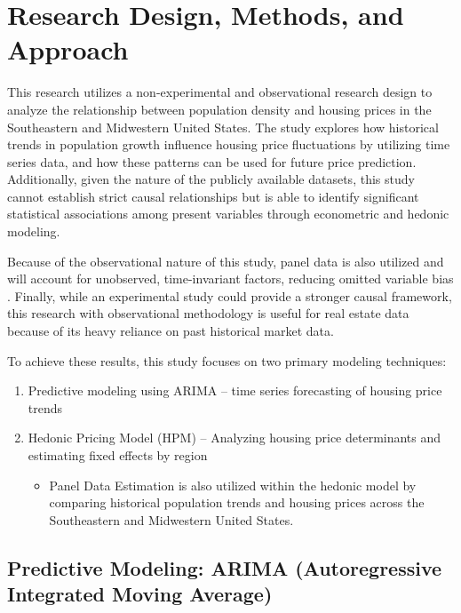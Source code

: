 \documentclass[journal,article,submit,pdftex,moreauthors]{Definitions/mdpi}
\begin{document}

\section{Research Design, Methods, and Approach}

This research utilizes a non-experimental and observational research design to analyze the relationship between population density and housing prices in the Southeastern and Midwestern United States. The study explores how historical trends in population growth influence housing price fluctuations by utilizing time series data, and how these patterns can be used for future price prediction. Additionally, given the nature of the publicly available datasets, this study cannot establish strict causal relationships but is able to identify significant statistical associations among present variables through econometric and hedonic modeling.

Because of the observational nature of this study, panel data is also utilized and will account for unobserved, time-invariant factors, reducing omitted variable bias \citep{torresreyna_2010_getting}. Finally, while an experimental study could provide a stronger causal framework, this research with observational methodology is useful for real estate data because of its heavy reliance on past historical market data.

To achieve these results, this study focuses on two primary modeling techniques:
\begin{enumerate}
    \item Predictive modeling using ARIMA – time series forecasting of housing price trends
    \item Hedonic Pricing Model (HPM) – Analyzing housing price determinants and estimating fixed effects by region
    \begin{itemize}
        \item Panel Data Estimation is also utilized within the hedonic model by comparing historical population trends and housing prices across the Southeastern and Midwestern United States.
    \end{itemize}
\end{enumerate}

\subsection{Predictive Modeling: ARIMA (Autoregressive Integrated Moving Average)}
\end{document}
